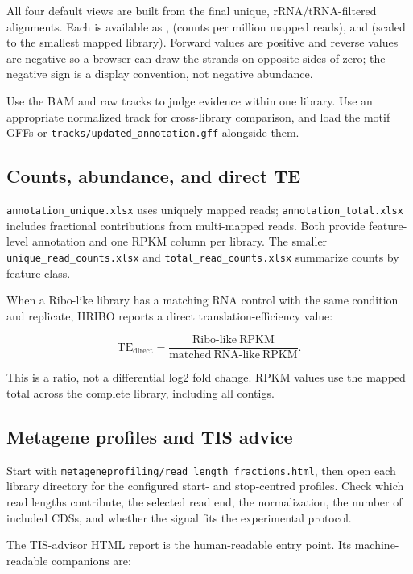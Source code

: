 \documentclass[11pt,a4paper]{article}
\newcommand{\setting}[1]{\texttt{\detokenize{#1}}}
\newcommand{\file}[1]{\nolinkurl{#1}}
\begin{document}
All four default views are built from the final unique, rRNA/tRNA-filtered
alignments. Each is available as \setting{raw}, \setting{mil} (counts per
million mapped reads), and \setting{min} (scaled to the smallest mapped
library). Forward values are positive and reverse values are negative so a
browser can draw the strands on opposite sides of zero; the negative sign is
a display convention, not negative abundance.

Use the BAM and raw tracks to judge evidence within one library. Use an
appropriate normalized track for cross-library comparison, and load the motif
GFFs or \file{tracks/updated_annotation.gff} alongside them.

\subsection{Counts, abundance, and direct TE}

\file{annotation_unique.xlsx} uses uniquely mapped reads;
\file{annotation_total.xlsx} includes fractional contributions from
multi-mapped reads. Both provide feature-level annotation and one RPKM column
per library. The smaller \file{unique_read_counts.xlsx} and
\file{total_read_counts.xlsx} summarize counts by feature class.

When a Ribo-like library has a matching RNA control with the same condition
and replicate, HRIBO reports a direct translation-efficiency value:

\[
  \mathrm{TE}_{\mathrm{direct}} =
  \frac{\mathrm{Ribo\mbox{-}like\ RPKM}}{\mathrm{matched\ RNA\mbox{-}like\ RPKM}}.
\]

This is a ratio, not a differential log2 fold change. RPKM values use the
mapped total across the complete library, including all contigs.

\subsection{Metagene profiles and TIS advice}

Start with \file{metageneprofiling/read_length_fractions.html}, then open each
library directory for the configured start- and stop-centred profiles. Check
which read lengths contribute, the selected read end, the normalization, the
number of included CDSs, and whether the signal fits the experimental
protocol.

The TIS-advisor HTML report is the human-readable entry point. Its
machine-readable companions are:
\end{document}
